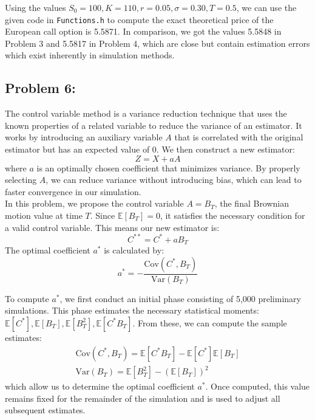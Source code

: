 \documentclass{report}
\begin{document}
Using the values $S_0=100, K=110, r=0.05, \sigma =0.30, T=0.5$, we can use the given code in \texttt{Functions.h} to compute the exact theoretical price of the European call option is 5.5871. In comparison, we got the values 5.5848 in Problem 3 and 5.5817 in Problem 4, which are close but contain estimation errors which exist inherently in simulation methods.


\newpage

\subsection*{Problem 6:}
The control variable method is a variance reduction technique that uses the known properties of a related variable to reduce the variance of an estimator. It works by introducing an auxiliary variable $A$ that is correlated with the original estimator but has an expected value of 0. We then construct a new estimator:
\[
Z = X+aA
\]
where $a$ is an optimally chosen coefficient that minimizes variance. By properly selecting $A$, we can reduce variance without introducing bias, which can lead to faster convergence in our simulation. \\

In this problem, we propose the control variable $A=B_T$, the final Brownian motion value at time $T$. Since $\mathbb{E}[B_T] = 0$, it satisfies the necessary condition for a valid control variable. This means our new estimator is:
\[
C^{**} = C^* + aB_T
\]
The optimal coefficient $a^*$ is calculated by:
\[
a^* = -\frac{\text{Cov}(C^*, B_T)}{\text{Var}(B_T)}
\]

To compute $a^*$, we first conduct an initial phase consisting of 5,000 preliminary simulations. This phase estimates the necessary statistical moments: $\mathbb{E}[C^*], \mathbb{E}[B_T], \mathbb{E}[B^2_T], \mathbb{E}[C^*B_T]$. From these, we can compute the sample estimates:
\begin{align*}
\text{Cov}(C^*, B_T) = \mathbb{E}[C^*B_T] - \mathbb{E}[C^*]\mathbb{E}[B_T] \\
\text{Var}(B_T)=\mathbb{E}[B^2_T] - (\mathbb{E}[B_T])^2
\end{align*}
which allow us to determine the optimal coefficient $a^*$. Once computed, this value remains fixed for the remainder of the simulation and is used to adjust all subsequent estimates. \\
\end{document}
